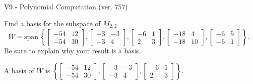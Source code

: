\begin{exercise}
  \begin{exerciseTitle}V9 - Polynomial Computation (ver. 757)\end{exerciseTitle}
  \begin{exerciseStatement}
    Find a basis for the subspace of \(M_{2,2}\) 
\[W=\mathrm{span}\ \left\{\left[\begin{array}{cc}
-54 & 12 \\
-54 & 30
\end{array}\right] , \left[\begin{array}{cc}
-3 & -3 \\
-3 & 4
\end{array}\right] , \left[\begin{array}{cc}
-6 & 1 \\
2 & 3
\end{array}\right] , \left[\begin{array}{cc}
-18 & 4 \\
-18 & 10
\end{array}\right] , \left[\begin{array}{cc}
-6 & 5 \\
-6 & 1
\end{array}\right]\right\}.\]
 Be sure to explain why your result is a basis.


  \end{exerciseStatement}
  \begin{exerciseAnswer}
   A basis of \(W\) is  \(\left\{\left[\begin{array}{cc}
-54 & 12 \\
-54 & 30
\end{array}\right] , \left[\begin{array}{cc}
-3 & -3 \\
-3 & 4
\end{array}\right] , \left[\begin{array}{cc}
-6 & 1 \\
2 & 3
\end{array}\right]\right\}\).
  


  \end{exerciseAnswer}
\end{exercise}